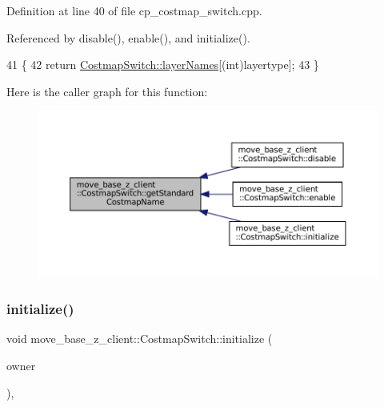 Definition at line 40 of file cp\+\_\+costmap\+\_\+switch.\+cpp.



Referenced by disable(), enable(), and initialize().


\begin{DoxyCode}
41 \{
42     \textcolor{keywordflow}{return} \hyperlink{classmove__base__z__client_1_1CostmapSwitch_adf295965004c939144db60ef353ad89e}{CostmapSwitch::layerNames}[(int)layertype];
43 \}
\end{DoxyCode}
Here is the caller graph for this function\+:
\nopagebreak
\begin{figure}[H]
\begin{center}
\leavevmode
\includegraphics[width=350pt]{classmove__base__z__client_1_1CostmapSwitch_ae8635d58b81be774e18eb4afa99413e1_icgraph}
\end{center}
\end{figure}
\mbox{\label{classmove__base__z__client_1_1CostmapSwitch_a6708159a16847c912e2d1e44c354983a}} 
\subsubsection{\texorpdfstring{initialize()}{initialize()}}
{\footnotesize\ttfamily void move\+\_\+base\+\_\+z\+\_\+client\+::\+Costmap\+Switch\+::initialize (\begin{DoxyParamCaption}\item[{\hyperlink{classsmacc_1_1ISmaccClient}{smacc\+::\+I\+Smacc\+Client} $\ast$}]{owner }\end{DoxyParamCaption})\hspace{0.3cm}{\ttfamily [override]}, {\ttfamily [virtual]}}



